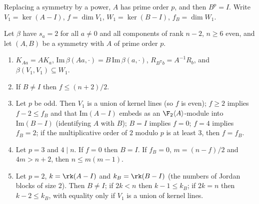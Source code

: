 Replacing a symmetry by a power, $A$ has prime order $p$, and then $B^p=I$. Write
$V_1=\ker(A-I)$, $f=\dim V_1$, $W_1=\ker(B-I)$, $f_B=\dim W_1$.
\begin{lemma}\label{lem:sym}
Let $\beta$ have $s_a=2$ for all $a\neq0$ and all components of rank $n-2$, $n\ge 6$ even,
and let $(A,B)$ be a symmetry with $A$ of prime order $p$.
\begin{enumerate}
\item[(a)] $K_{Aa}=AK_a$, $\mathrm{Im}\,\beta(Aa,\cdot)=B\,\mathrm{Im}\,\beta(a,\cdot)$,
$R_{B^{\mathsf T}b}=A^{-1}R_b$, and $\beta(V_1,V_1)\subseteq W_1$.
\item[(b)] If $B\neq I$ then $f\le (n+2)/2$.
\item[(c)] Let $p$ be odd. Then $V_1$ is a union of kernel lines (so $f$ is even); $f\ge2$ implies
$f-2\le f_B$ and that $\mathrm{Im}(A-I)$ embeds as an $\F_2\langle A\rangle$-module into
$\mathrm{Im}(B-I)$ (identifying $A$ with $B$); $B=I$ implies $f=0$; $f=4$ implies $f_B=2$; if
the multiplicative order of $2$ modulo $p$ is at least $3$, then $f=f_B$.
\item[(d)] Let $p=3$ and $4\mid n$. If $f=0$ then $B=I$. If $f_B=0$, $m=(n-f)/2$ and $4m>n+2$,
then $n\le m(m-1)$.
\item[(e)] Let $p=2$, $k=\rk(A-I)$ and $k_B=\rk(B-I)$ (the numbers of Jordan blocks of size
$2$). Then $B\neq I$; if $2k<n$ then $k-1\le k_B$; if $2k=n$ then $k-2\le k_B$, with equality
only if $V_1$ is a union of kernel lines.
\end{enumerate}
\end{lemma}
